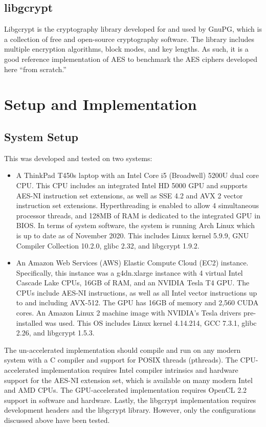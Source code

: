\documentclass[a4paper,10pt]{article}
\begin{document}
\subsection{libgcrypt}

Libgcrypt is the cryptography library developed for and used by GnuPG, which is a collection of free and open-source cryptography software.  The library includes multiple encryption algorithms, block modes, and key lengths.  As such, it is a good reference implementation of AES to benchmark the AES ciphers developed here ``from scratch.''

\section{Setup and Implementation}
 
\subsection{System Setup}

This was developed and tested on two systems:
\begin{itemize}
\item{A ThinkPad T450s laptop with an Intel Core i5 (Broadwell) 5200U dual core CPU.  This CPU includes an integrated Intel HD 5000 GPU and supports AES-NI instruction set extensions, as well as SSE 4.2 and AVX 2 vector instruction set extensions.  Hyperthreading is enabled to allow 4 simultaneous processor threads, and 128MB of RAM is dedicated to the integrated GPU in BIOS.  In terms of system software, the system is running Arch Linux which is up to date as of November 2020.  This includes Linux kernel 5.9.9, GNU Compiler Collection 10.2.0, glibc 2.32, and libgcrypt 1.9.2.}

\item{An Amazon Web Services (AWS) Elastic Compute Cloud (EC2) instance.  Specifically, this instance was a g4dn.xlarge instance with 4 virtual Intel Cascade Lake CPUs, 16GB of RAM, and an NVIDIA Tesla T4 GPU.  The CPUs include AES-NI instructions, as well as all Intel vector instructions up to and including AVX-512.  The GPU has 16GB of memory and 2,560 CUDA cores.  An Amazon Linux 2 machine image with NVIDIA's Tesla drivers pre-installed was used.  This OS includes Linux kernel 4.14.214, GCC 7.3.1, glibc 2.26, and libgcrypt 1.5.3.}
\end{itemize}

The un-accelerated implementation should compile and run on any modern system with a C compiler and support for POSIX threads (pthreads).  The CPU-accelerated implementation requires Intel compiler intrinsics and hardware support for the AES-NI extension set, which is available on many modern Intel and AMD CPUs.  The GPU-accelerated implementation requires OpenCL 2.2 support in software and hardware.  Lastly, the libgcrypt implementation requires development headers and the libgcrypt library.  However, only the configurations discussed above have been tested.
\end{document}
